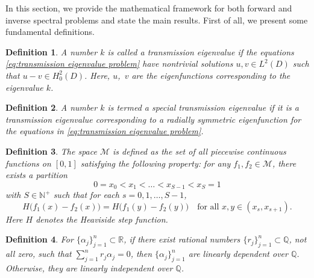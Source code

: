 \documentclass[11pt,reqno]{amsart}
\newtheorem{definition}{Definition}[section]
\theoremstyle{definition}
\theoremstyle{remark}
\numberwithin{equation}{section}
\begin{document}
In this section, we provide the mathematical framework for both forward and inverse spectral problems and state the main results.
First of all, we present some fundamental definitions.

 \begin{definition}\label{def:transmission eigenvalue}
	 	A number $ k $ is called a transmission eigenvalue if the equations \eqref{eq:transmission eigenvalue problem} have nontrivial solutions $ u, v \in L^2(D) $ such that $ u - v \in H_0^2(D) $. Here, $ u $,~$ v $ are the eigenfunctions corresponding to the eigenvalue $ k $.
 \end{definition}

 \begin{definition}\label{def:special transmission eigenvalue}
	 A number \( k \) is termed a \emph{special transmission eigenvalue} if it is a transmission eigenvalue corresponding to a radially symmetric eigenfunction for the equations in \eqref{eq:transmission eigenvalue problem}.
	 \end{definition}


\begin{definition}\label{def:space M}
The space $\mathcal{M}$ is defined as the set of all piecewise continuous functions on $[0,1]$ satisfying the following property: for any $f_1, f_2 \in \mathcal{M}$, there exists a partition
\begin{equation*}
0 = x_0 < x_1 < \dots < x_{S-1} < x_S = 1
\end{equation*}
with $S \in \mathbb{N}^+$ such that for each $s = 0, 1, \dots, S-1$,
\begin{equation*}
H\bigl(f_1(x) - f_2(x)\bigr) = H\bigl(f_1(y) - f_2(y)\bigr)
\quad \text{for all } x, y \in (x_s, x_{s+1}).
\end{equation*}
Here $H$ denotes the Heaviside step function.
\end{definition}


 \begin{definition}\label{def:rational linear independent}
	    For $ \{\alpha_j \}_{j=1}^{n}\subset  \mathbb{R}$, if there exist rational numbers $ \{ r_j \}_{j=1}^{n} \subset \mathbb{Q}$, not all zero, such that $\sum_{j=1}^{n} r_j \alpha_j = 0 $, then $\{\alpha_j \}_{j=1}^{n}$ are linearly dependent over $ \mathbb{Q} $. Otherwise, they are linearly independent over $ \mathbb{Q} $.
\end{definition}
\end{document}
